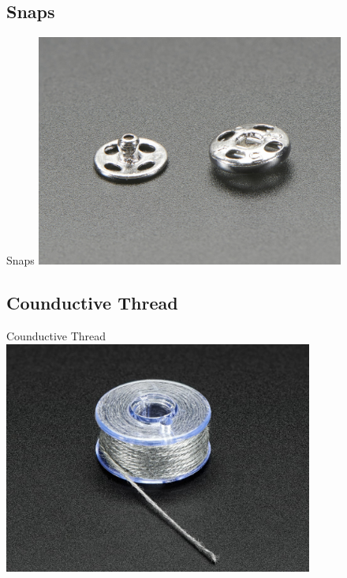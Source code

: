 \documentclass{beamer}
\begin{document}
\subsection{Snaps}
\begin{frame}[fragile]{Snaps}
\includegraphics[height=3in]{snap.jpg}
\end{frame}
\subsection{Counductive Thread}
\begin{frame}[fragile]{Counductive Thread}
\includegraphics[height=3in]{counductivethread.jpg}
\end{frame}
\end{document}
